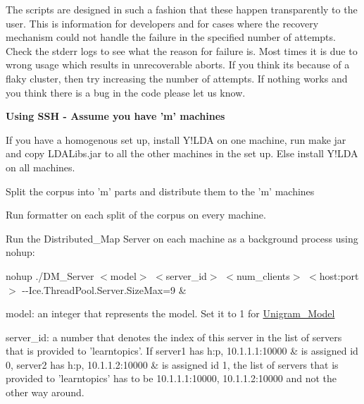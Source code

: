 \begin{DoxyEnumerate}
\begin{DoxyEnumerate}
The scripts are designed in such a fashion that these happen transparently to the user. This is information for developers and for cases where the recovery mechanism could not handle the failure in the specified number of attempts. Check the stderr logs to see what the reason for failure is. Most times it is due to wrong usage which results in unrecoverable aborts. If you think its because of a flaky cluster, then try increasing the number of attempts. If nothing works and you think there is a bug in the code please let us know. 
\end{DoxyEnumerate}
\end{DoxyEnumerate}
\begin{DoxyEnumerate}
\item 

{\bfseries Using SSH -\/ Assume you have 'm' machines} 
\begin{DoxyEnumerate}
\item 

If you have a homogenous set up, install Y!LDA on one machine, run make jar and copy LDALibs.jar to all the other machines in the set up. Else install Y!LDA on all machines. 
\item 

Split the corpus into 'm' parts and distribute them to the 'm' machines 
\item 

Run formatter on each split of the corpus on every machine. 
\item 

Run the Distributed\_\-Map Server on each machine as a background process using nohup: 

{\ttfamily nohup ./DM\_\-Server $<$model$>$ $<$server\_\-id$>$ $<$num\_\-clients$>$ $<$host:port$>$ -\/-\/Ice.ThreadPool.Server.SizeMax=9 \&} 
\begin{DoxyEnumerate}
\item 

model: an integer that represents the model. Set it to 1 for \hyperlink{class_unigram___model}{Unigram\_\-Model} 
\item 

server\_\-id: a number that denotes the index of this server in the list of servers that is provided to 'learntopics'. If server1 has h:p, 10.1.1.1:10000 \& is assigned id 0, server2 has h:p, 10.1.1.2:10000 \& is assigned id 1, the list of servers that is provided to 'learntopics' has to be 10.1.1.1:10000, 10.1.1.2:10000 and not the other way around. 
\item 


\end{DoxyEnumerate}
\end{DoxyEnumerate}
\end{DoxyEnumerate}
